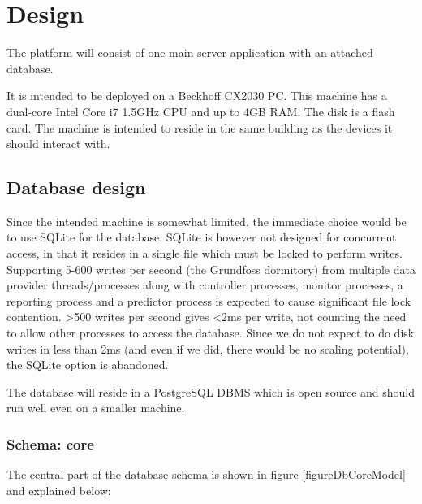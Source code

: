 
\chapter{Design}
The platform will consist of one main server application with an attached database. 

It is intended to be deployed on a Beckhoff CX2030 PC. This machine has a dual-core Intel Core i7 1.5GHz CPU and up to 4GB RAM. The disk is a flash card. The machine is intended to reside in the same building as the devices it should interact with.

\section{Database design}
Since the intended machine is somewhat limited, the immediate choice would be to use SQLite for the database.
SQLite is however not designed for concurrent access, in that it resides in a single file which must be locked to perform writes. Supporting 5-600 writes per second (the Grundfoss dormitory) from multiple data provider threads/processes along with controller processes, monitor processes, a reporting process and a predictor process is expected to cause significant file lock contention. \textgreater500 writes per second gives \textless2ms per write, not counting the need to allow other processes to access the database. Since we do not expect to do disk writes in less than 2ms (and even if we did, there would be no scaling potential), the SQLite option is abandoned.

The database will reside in a PostgreSQL DBMS which is open source and should run well even on a smaller machine.

\subsection{Schema: core}
The central part of the database schema is shown in figure \ref{figureDbCoreModel} and explained below:


